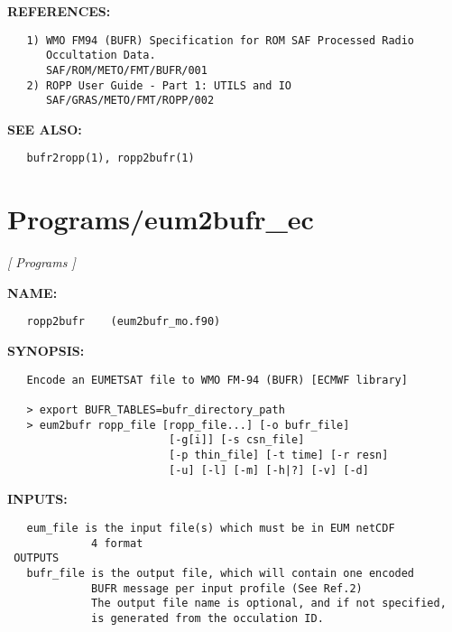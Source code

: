 \textbf{REFERENCES:}\hspace{0.08in}\begin{Verbatim}
   1) WMO FM94 (BUFR) Specification for ROM SAF Processed Radio
      Occultation Data.
      SAF/ROM/METO/FMT/BUFR/001
   2) ROPP User Guide - Part 1: UTILS and IO
      SAF/GRAS/METO/FMT/ROPP/002
\end{Verbatim}
\textbf{SEE ALSO:}\hspace{0.08in}\begin{Verbatim}
   bufr2ropp(1), ropp2bufr(1)
\end{Verbatim}
\section{Programs/eum2bufr\_ec}
\textsl{[ Programs ]}

\label{ch:robo82}
\label{ch:Programs_eum2bufr_ec}
\textbf{NAME:}\hspace{0.08in}\begin{Verbatim}
   ropp2bufr    (eum2bufr_mo.f90)
\end{Verbatim}
\textbf{SYNOPSIS:}\hspace{0.08in}\begin{Verbatim}
   Encode an EUMETSAT file to WMO FM-94 (BUFR) [ECMWF library]

   > export BUFR_TABLES=bufr_directory_path
   > eum2bufr ropp_file [ropp_file...] [-o bufr_file]
                         [-g[i]] [-s csn_file]
                         [-p thin_file] [-t time] [-r resn]
                         [-u] [-l] [-m] [-h|?] [-v] [-d]
\end{Verbatim}
\textbf{INPUTS:}\hspace{0.08in}\begin{Verbatim}
   eum_file is the input file(s) which must be in EUM netCDF
             4 format
 OUTPUTS
   bufr_file is the output file, which will contain one encoded
             BUFR message per input profile (See Ref.2)
             The output file name is optional, and if not specified,
             is generated from the occulation ID.
\end{Verbatim}
